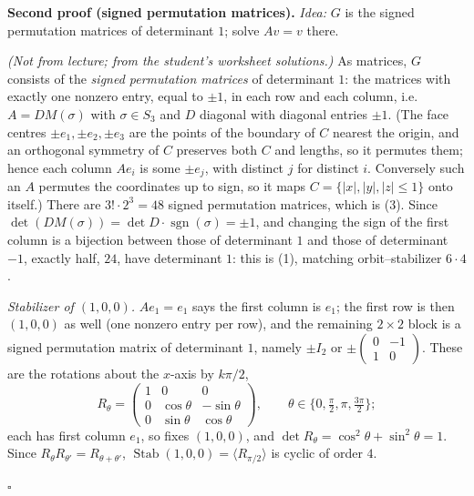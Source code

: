 \documentclass[11pt]{report}
\newcommand{\sgn}{\operatorname{sgn}}
\renewenvironment{proof}[1][Proof]{\noindent\textbf{#1.} }{\hfill$\square$\par\vspace{5pt}}
\begin{document}
\begin{proof}[Second proof (signed permutation matrices)]
\textit{Idea:} $G$ is the signed permutation matrices of determinant $1$; solve $Av = v$ there.\par
\textit{(Not from lecture; from the student's worksheet solutions.)} As matrices, $G$ consists of the \emph{signed permutation matrices} of determinant $1$: the matrices with exactly one nonzero entry, equal to $\pm 1$, in each row and each column, i.e.\ $A = DM(\sigma)$ with $\sigma \in S_3$ and $D$ diagonal with diagonal entries $\pm 1$. (The face centres $\pm e_1, \pm e_2, \pm e_3$ are the points of the boundary of $C$ nearest the origin, and an orthogonal symmetry of $C$ preserves both $C$ and lengths, so it permutes them; hence each column $Ae_i$ is some $\pm e_j$, with distinct $j$ for distinct $i$. Conversely such an $A$ permutes the coordinates up to sign, so it maps $C = \{|x|, |y|, |z| \leq 1\}$ onto itself.) There are $3! \cdot 2^3 = 48$ signed permutation matrices, which is (3). Since $\det(DM(\sigma)) = \det D \cdot \sgn(\sigma) = \pm 1$, and changing the sign of the first column is a bijection between those of determinant $1$ and those of determinant $-1$, exactly half, $24$, have determinant $1$: this is (1), matching orbit--stabilizer $6 \cdot 4$.

\emph{Stabilizer of $(1,0,0)$.} $Ae_1 = e_1$ says the first column is $e_1$; the first row is then $(1, 0, 0)$ as well (one nonzero entry per row), and the remaining $2 \times 2$ block is a signed permutation matrix of determinant $1$, namely $\pm I_2$ or $\pm\begin{pmatrix} 0 & -1 \\ 1 & 0 \end{pmatrix}$. These are the rotations about the $x$-axis by $k\pi/2$,
\[ R_\theta = \begin{pmatrix} 1 & 0 & 0 \\ 0 & \cos\theta & -\sin\theta \\ 0 & \sin\theta & \cos\theta \end{pmatrix}, \qquad \theta \in \{0, \tfrac{\pi}{2}, \pi, \tfrac{3\pi}{2}\}; \]
each has first column $e_1$, so fixes $(1,0,0)$, and $\det R_\theta = \cos^2\theta + \sin^2\theta = 1$. Since $R_\theta R_{\theta'} = R_{\theta + \theta'}$, $\operatorname{Stab}(1,0,0) = \langle R_{\pi/2} \rangle$ is cyclic of order $4$.


\end{proof}
\end{document}
